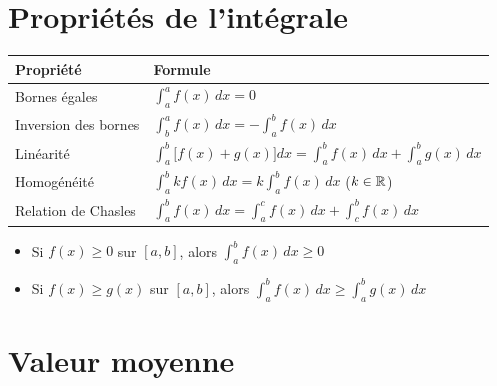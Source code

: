 \section{Propri\'{e}t\'{e}s de l'int\'{e}grale}

\begin{propriete}
  \bigskip
  \begin{center}
  \renewcommand{\arraystretch}{2.2}
  \begin{tabular}{|p{4cm}|p{8cm}|}
    \hline
    \textbf{\color{navy}Propri\'{e}t\'{e}}
      & \textbf{\color{navy}Formule} \\
    \hline\hline
    Bornes \'{e}gales
      & $\displaystyle\int_a^a f(x)\,dx = 0$ \\
    \hline
    Inversion des bornes
      & $\displaystyle\int_b^a f(x)\,dx = -\int_a^b f(x)\,dx$ \\
    \hline
    Lin\'{e}arit\'{e}
      & $\displaystyle\int_a^b \bigl[f(x)+g(x)\bigr]dx
         = \int_a^b f(x)\,dx + \int_a^b g(x)\,dx$ \\
    \hline
    Homog\'{e}n\'{e}it\'{e}
      & $\displaystyle\int_a^b kf(x)\,dx = k\int_a^b f(x)\,dx$
        \quad ($k \in \mathbb{R}$) \\
    \hline
    Relation de Chasles
      & $\displaystyle\int_a^b f(x)\,dx
         = \int_a^c f(x)\,dx + \int_c^b f(x)\,dx$ \\
    \hline
  \end{tabular}
  \end{center}
\end{propriete}

\begin{propriete}
  \begin{itemize}
    \item Si $f(x) \geq 0$ sur $[a,b]$, alors
          $\displaystyle\int_a^b f(x)\,dx \geq 0$
    \item Si $f(x) \geq g(x)$ sur $[a,b]$, alors
          $\displaystyle\int_a^b f(x)\,dx \geq \int_a^b g(x)\,dx$
  \end{itemize}
\end{propriete}

\section{Valeur moyenne}

